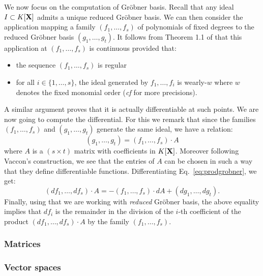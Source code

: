 \documentclass{amsart}
\begin{document}
We now focus on the computation of Gr\"obner basis. Recall that any 
ideal $I \subset K[\mathbf X]$ admits a unique reduced Gr\"obner basis. We 
can then consider the application mapping a family $(f_1, \ldots, f_s)$ 
of polynomials of fixed degrees to the reduced Gr\"obner basis $(g_1, 
\ldots, g_t)$. It follows from Theorem 1.1 of \cite{Vaccon} that this 
application at $(f_1, \ldots, f_s)$ is continuous provided that:
\begin{itemize}
\item the sequence $(f_1, \ldots, f_s)$ is regular
\item for all $i \in \{1, \ldots, s\}$, the ideal generated by
$f_1, \ldots, f_i$ is wearly-$w$ where $w$ denotes the fixed monomial
order (\emph{cf} \cite{Vaccon} for more precisions).
\end{itemize}
A similar argument proves that it is actually differentiable at such
points. We are now going to compute the differential. For this we
remark that since the families $(f_1, \ldots, f_s)$ and $(g_1, \ldots,
g_t)$ generate the same ideal, we have a relation:
\begin{equation}
\label{eq:prodgrobner}
(g_1, \ldots, g_t) = (f_1, \ldots, f_s) \cdot A
\end{equation}
where $A$ is a $(s \times t)$ matrix with coefficients in $K[\mathbf X]$.
Moreover following Vaccon's construction, we see that the entries of $A$ 
can be chosen in such a way that they define differentiable functions.
Differentiating Eq.~\eqref{eq:prodgrobner}, we get:
$$(d f_1, \ldots, d f_s) \cdot A = - (f_1, \ldots, f_s) \cdot dA + 
(d g_1, \ldots, d g_t).$$
Finally, using that we are working with \emph{reduced} Gr\"obner
basis, the above equality implies that $d f_i$ is the remainder in
the division of the $i$-th coefficient of the product
$(d f_1, \ldots, d f_s) \cdot A$ by the family $(f_1, \ldots, f_s)$.


\subsubsection*{Matrices}


\subsubsection*{Vector spaces}

\end{document}
